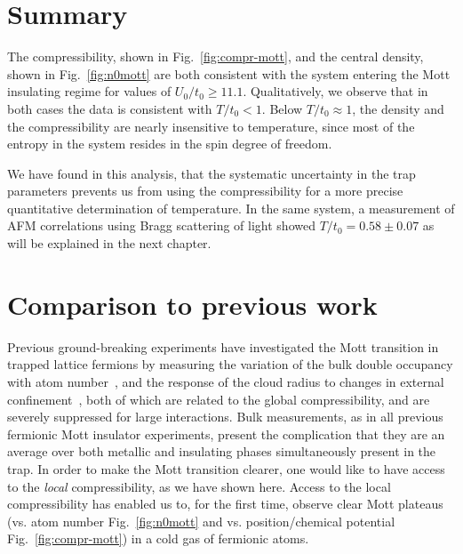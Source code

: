 \FigureFour

\section{Summary} 

The compressibility, shown in Fig.~\ref{fig:compr-mott}, and the central
density, shown in Fig.~\ref{fig:n0mott} are both consistent with the system
entering the Mott insulating regime for values of $U_{0}/t_{0} \geq 11.1$.
Qualitatively, we observe that in both cases the data is consistent with
$T/t_{0}<1$.   Below $T/t_{0}\approx1$, the density and the compressibility are
nearly insensitive to temperature, since most of the entropy in the system
resides in the spin degree of freedom.   

We have found in this analysis, that the systematic uncertainty in the trap
parameters prevents us from using the compressibility for a more precise
quantitative determination of temperature.   In the same system, a measurement
of AFM correlations using Bragg scattering of light showed $T/t_{0}=
0.58\pm0.07$ as will be explained in the next chapter. 

\section{Comparison to previous work} 


Previous ground-breaking experiments have investigated the Mott transition in
trapped lattice fermions by measuring the variation of the bulk double
occupancy with atom number~\cite{Jordens2008,Scarola2009,Jordens2010,Taie2012},
and the response of the cloud radius to changes in external
confinement~\cite{Schneider2008}, both of which are related to the global
compressibility, and are severely suppressed for large interactions.  Bulk
measurements, as in all previous fermionic Mott insulator experiments, present
the complication that they are an average over both metallic and insulating
phases simultaneously present in the trap.  In order to make the Mott
transition clearer, one would like to have access to the \textit{local}
compressibility, as we have shown here.  Access to the local compressibility
has enabled us to, for the first time, observe clear Mott plateaus (vs. atom
number Fig.~\ref{fig:n0mott} and vs. position/chemical potential
Fig.~\ref{fig:compr-mott}) in a cold gas of fermionic atoms.  

